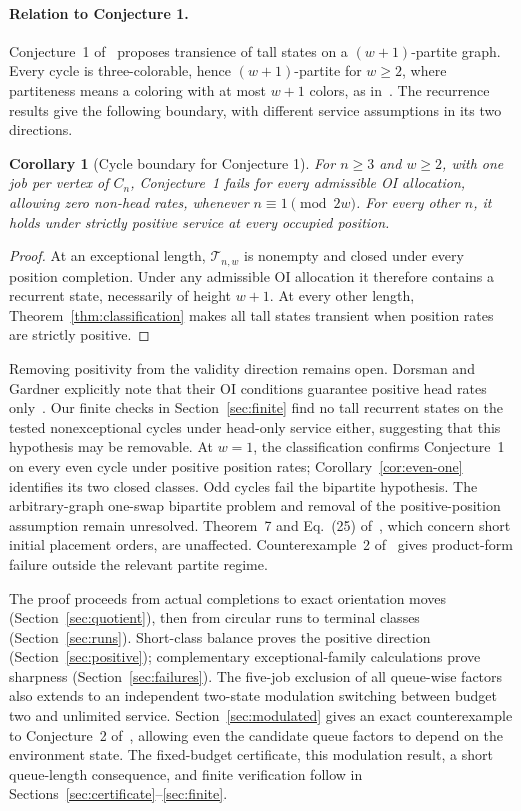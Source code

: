 \documentclass[11pt]{article}
\newtheorem{corollary}[theorem]{Corollary}
\theoremstyle{remark}
\newcommand{\T}{\mathcal T_{n,w}}
\begin{document}
\paragraph{Relation to Conjecture 1.}
Conjecture~1 of~\cite[p.~241]{DG} proposes transience of tall states on a $(w+1)$-partite graph. Every cycle is three-colorable, hence $(w+1)$-partite for $w\ge2$, where partiteness means a coloring with at most $w+1$ colors, as in~\cite[Lemma~3, pp.~252--253]{DG}. The recurrence results give the following boundary, with different service assumptions in its two directions.

\begin{corollary}[Cycle boundary for Conjecture 1]\label{cor:conjecture}
For $n\ge3$ and $w\ge2$, with one job per vertex of $C_n$, Conjecture~1 fails for every admissible OI allocation, allowing zero non-head rates, whenever $n\equiv1\pmod{2w}$. For every other $n$, it holds under strictly positive service at every occupied position.
\end{corollary}
\begin{proof}
At an exceptional length, $\T$ is nonempty and closed under every position completion. Under any admissible OI allocation it therefore contains a recurrent state, necessarily of height $w+1$. At every other length, Theorem~\ref{thm:classification} makes all tall states transient when position rates are strictly positive.
\end{proof}

Removing positivity from the validity direction remains open. Dorsman and Gardner explicitly note that their OI conditions guarantee positive head rates only~\cite[Appendix~C.2, p.~254]{DG}. Our finite checks in Section~\ref{sec:finite} find no tall recurrent states on the tested nonexceptional cycles under head-only service either, suggesting that this hypothesis may be removable. At $w=1$, the classification confirms Conjecture~1 on every even cycle under positive position rates; Corollary~\ref{cor:even-one} identifies its two closed classes. Odd cycles fail the bipartite hypothesis. The arbitrary-graph one-swap bipartite problem and removal of the positive-position assumption remain unresolved. Theorem~7 and Eq.~(25) of~\cite[p.~240]{DG}, which concern short initial placement orders, are unaffected. Counterexample~2 of~\cite[p.~239]{DG} gives product-form failure outside the relevant partite regime.

The proof proceeds from actual completions to exact orientation moves (Section~\ref{sec:quotient}), then from circular runs to terminal classes (Section~\ref{sec:runs}). Short-class balance proves the positive direction (Section~\ref{sec:positive}); complementary exceptional-family calculations prove sharpness (Section~\ref{sec:failures}). The five-job exclusion of all queue-wise factors also extends to an independent two-state modulation switching between budget two and unlimited service. Section~\ref{sec:modulated} gives an exact counterexample to Conjecture~2 of~\cite[p.~245]{DG}, allowing even the candidate queue factors to depend on the environment state. The fixed-budget certificate, this modulation result, a short queue-length consequence, and finite verification follow in Sections~\ref{sec:certificate}--\ref{sec:finite}.
\end{document}
